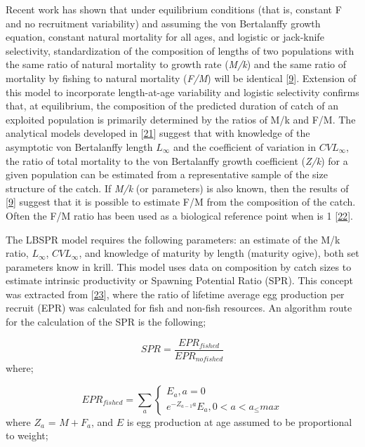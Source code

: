 \documentclass[
]{article}
\begin{document}
Recent work has shown that under equilibrium conditions (that is,
constant F and no recruitment variability) and assuming the von
Bertalanffy growth equation, constant natural mortality for all ages,
and logistic or jack-knife selectivity, standardization of the
composition of lengths of two populations with the same ratio of natural
mortality to growth rate (\emph{M/k}) and the same ratio of mortality by
fishing to natural mortality (\emph{F/M}) will be identical
{[}\protect\hyperlink{ref-Hordyk2016}{9}{]}. Extension of this model to
incorporate length-at-age variability and logistic selectivity confirms
that, at equilibrium, the composition of the predicted duration of catch
of an exploited population is primarily determined by the ratios of M/k
and F/M. The analytical models developed in
{[}\protect\hyperlink{ref-Hordyk2014c}{21}{]} suggest that with
knowledge of the asymptotic von Bertalanffy length \(L_{\infty}\) and
the coefficient of variation in \(CVL_{\infty}\), the ratio of total
mortality to the von Bertalanffy growth coefficient (\emph{Z/k}) for a
given population can be estimated from a representative sample of the
size structure of the catch. If \emph{M/k} (or parameters) is also
known, then the results of {[}\protect\hyperlink{ref-Hordyk2016}{9}{]}
suggest that it is possible to estimate F/M from the composition of the
catch. Often the F/M ratio has been used as a biological reference point
when is 1 {[}\protect\hyperlink{ref-Zhou2012}{22}{]}.

The LBSPR model requires the following parameters: an estimate of the
M/k ratio, \(L_{\infty}\), \(CVL_{\infty}\), and knowledge of maturity
by length (maturity ogive), both set parameters know in krill. This
model uses data on composition by catch sizes to estimate intrinsic
productivity or Spawning Potential Ratio (SPR). This concept was
extracted from {[}\protect\hyperlink{ref-Goodyear1993}{23}{]}, where the
ratio of lifetime average egg production per recruit (EPR) was
calculated for fish and non-fish resources. An algorithm route for the
calculation of the SPR is the following;

\[{SPR}=\frac{EPR_{fished}}{EPR_{nofished}}\] where;

\[
EPR_{fished} =
\sum_{a}
\begin{cases}
 E_{a},  a = 0  \\
 e^{-Z_{{a-1}}a} {E_a}, 0 < a  < a_\le{max}
 \end{cases}       
\] where \(Z_a\) = \(M+F_a\), and \(E\) is egg production at age assumed
to be proportional to weight;
\end{document}
